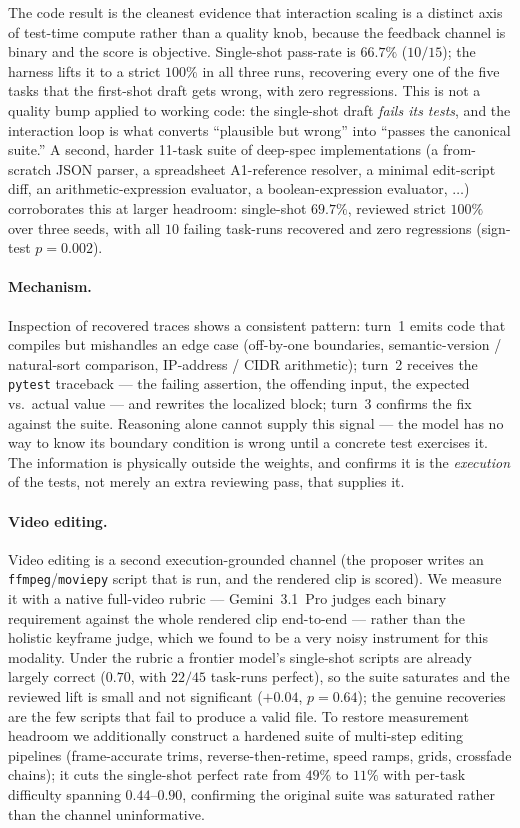 \documentclass[11pt]{article}
\begin{document}
The code result is the cleanest evidence that interaction scaling is a distinct axis of test-time compute rather than a quality knob, because the feedback channel is binary and the score is objective. Single-shot pass-rate is $66.7\%$ ($10/15$); the harness lifts it to a strict $100\%$ in all three runs, recovering every one of the five tasks that the first-shot draft gets wrong, with zero regressions. This is not a quality bump applied to working code: the single-shot draft \emph{fails its tests}, and the interaction loop is what converts ``plausible but wrong'' into ``passes the canonical suite.'' A second, harder 11-task suite of deep-spec implementations (a from-scratch JSON parser, a spreadsheet A1-reference resolver, a minimal edit-script diff, an arithmetic-expression evaluator, a boolean-expression evaluator, $\dots$) corroborates this at larger headroom: single-shot $69.7\%$, reviewed strict $100\%$ over three seeds, with all $10$ failing task-runs recovered and zero regressions (sign-test $p=0.002$).

\paragraph{Mechanism.} Inspection of recovered traces shows a consistent pattern: turn~1 emits code that compiles but mishandles an edge case (off-by-one boundaries, semantic-version / natural-sort comparison, IP-address / CIDR arithmetic); turn~2 receives the \texttt{pytest} traceback --- the failing assertion, the offending input, the expected vs.\ actual value --- and rewrites the localized block; turn~3 confirms the fix against the suite. Reasoning alone cannot supply this signal --- the model has no way to know its boundary condition is wrong until a concrete test exercises it. The information is physically outside the weights, and  confirms it is the \emph{execution} of the tests, not merely an extra reviewing pass, that supplies it.

\paragraph{Video editing.}
\label{sec:harness-video}
Video editing is a second execution-grounded channel (the proposer writes an \texttt{ffmpeg}/\texttt{moviepy} script that is run, and the rendered clip is scored). We measure it with a native full-video rubric --- Gemini~3.1~Pro judges each binary requirement against the whole rendered clip end-to-end --- rather than the holistic keyframe judge, which we found to be a very noisy instrument for this modality. Under the rubric a frontier model's single-shot scripts are already largely correct ($0.70$, with $22/45$ task-runs perfect), so the suite saturates and the reviewed lift is small and not significant ($+0.04$, $p{=}0.64$); the genuine recoveries are the few scripts that fail to produce a valid file. To restore measurement headroom we additionally construct a hardened suite of multi-step editing pipelines (frame-accurate trims, reverse-then-retime, speed ramps, grids, crossfade chains); it cuts the single-shot perfect rate from $49\%$ to $11\%$ with per-task difficulty spanning $0.44$--$0.90$, confirming the original suite was saturated rather than the channel uninformative.
\end{document}
